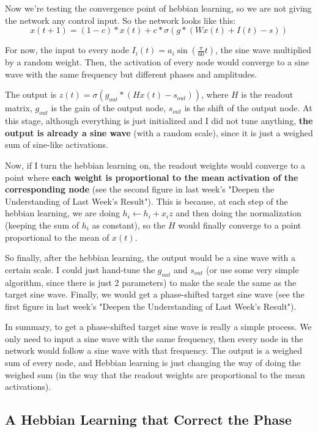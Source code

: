 \documentclass[12pt, a4paper]{article}
\begin{document}
Now we're testing the convergence point of hebbian learning, so we are not giving the network any control input. So the network looks like this:
$$x(t+1) = (1-c)*x(t) + c*\sigma(g * (Wx(t) + I(t) - s))$$

For now, the input to every node $I_i(t) = a_i \sin(\frac{\pi}{60}t)$, the sine wave multiplied by a random weight. Then, the activation of every node would converge to a sine wave with the same frequency but different phases and amplitudes.


The output is $z(t)=\sigma(g_{out}*(Hx(t)-s_{out}))$, where $H$ is the readout matrix, $g_{out}$ is the gain of the output node, $s_{out}$ is the shift of the output node. At this stage, although everything is just initialized and I did not tune anything, \textbf{the output is already a sine wave} (with a random scale), since it is just a weighed sum of sine-like activations.

Now, if I turn the hebbian learning on, the readout weights would converge to a point where \textbf{each weight is proportional to the mean activation of the corresponding node} (see the second figure in last week's "Deepen the Understanding of Last Week's Result"). This is because, at each step of the hebbian learning, we are doing $h_i \leftarrow h_i + x_i z$ and then doing the normalization (keeping the sum of $h_i$ as constant), so the $H$ would finally converge to a point proportional to the mean of $x(t)$.

So finally, after the hebbian learning, the output would be a sine wave with a certain scale. I could just hand-tune the $g_{out}$ and $s_{out}$ (or use some very simple algorithm, since there is just 2 parameters) to make the scale the same as the target sine wave. Finally, we would get a phase-shifted target sine wave (see the first figure in last week's "Deepen the Understanding of Last Week's Result").

In summary, to get a phase-shifted target sine wave is really a simple process. We only need to input a sine wave with the same frequency, then every node in the network would follow a sine wave with that frequency. The output is a weighed sum of every node, and Hebbian learning is just changing the way of doing the weighed sum (in the way that the readout weights are proportional to the mean activations).

\newpage

\subsection*{A Hebbian Learning that Correct the Phase}
\end{document}
